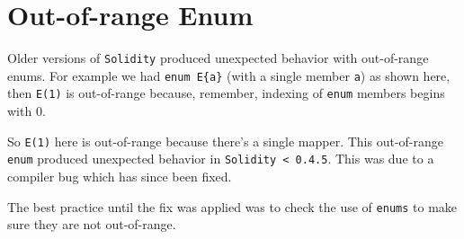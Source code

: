 \section{Out-of-range Enum}\label{out-of-range-enum}

Older versions of \texttt{Solidity} produced unexpected behavior with
out-of-range enums. For example we had \texttt{enum\ E\{a\}} (with a
single member \texttt{a}) as shown here, then \texttt{E(1)} is
out-of-range because, remember, indexing of \texttt{enum} members begins
with 0.

So \texttt{E(1)} here is out-of-range because there's a single mapper.
This out-of-range \texttt{enum} produced unexpected behavior in
\texttt{Solidity\ \textless{}\ 0.4.5}. This was due to a compiler bug
which has since been fixed.

The best practice until the fix was applied was to check the use of
\texttt{enums} to make sure they are not out-of-range.
